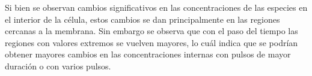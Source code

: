 Si bien se observan cambios significativos en las concentraciones de las especies en el interior de la célula, estos cambios se dan principalmente en las regiones cercanas a la membrana. Sin embargo se observa que con el paso del tiempo las regiones con valores extremos se vuelven mayores, lo cuál indica que se podrían obtener mayores cambios en las concentraciones internas con pulsos de mayor duración o con varios pulsos. 

\newcommand{\lineasnap}[7]{
	#2 &
	\texttt{[image: \#1\#3.png]} & 
	\texttt{[image: \#1\#4.png]} & 
	\texttt{[image: \#1\#5.png]} & 
	\texttt{[image: \#1\#6.png]} & 
	\texttt{[image: \#1\#7.png]} \\
}

\newcommand{\lineasnapscale}[9]{
	#2 &
	\texttt{[image: \#1\#3.png]} & 
	\texttt{[image: \#1\#4.png]} & 
	\texttt{[image: \#1\#5.png]} & 
	\texttt{[image: \#1\#6.png]} & 
	\texttt{[image: \#1\#7.png]} &
	\texttt{[image: \#9]} \\
}


